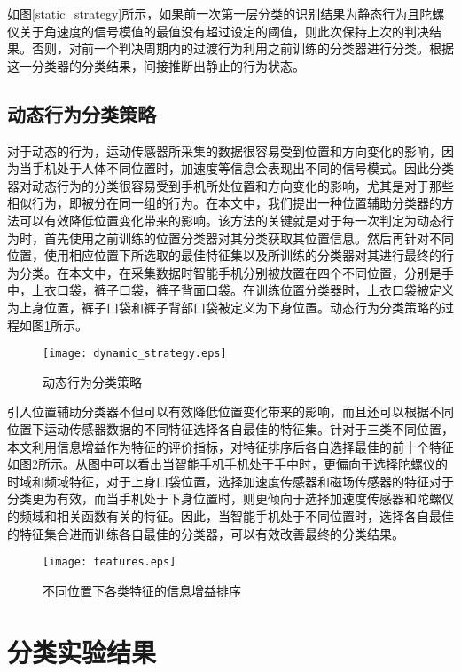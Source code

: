 \par 如图\ref{static_strategy}所示，如果前一次第一层分类的识别结果为静态行为且陀螺仪关于角速度的信号模值的最值没有超过设定的阈值，则此次保持上次的判决结果。否则，对前一个判决周期内的过渡行为利用之前训练的分类器进行分类。根据这一分类器的分类结果，间接推断出静止的行为状态。

\subsection{动态行为分类策略}
\par 对于动态的行为，运动传感器所采集的数据很容易受到位置和方向变化的影响，因为当手机处于人体不同位置时，加速度等信息会表现出不同的信号模式。因此分类器对动态行为的分类很容易受到手机所处位置和方向变化的影响，尤其是对于那些相似行为，即被分在同一组的行为。在本文中，我们提出一种位置辅助分类器的方法可以有效降低位置变化带来的影响。该方法的关键就是对于每一次判定为动态行为时，首先使用之前训练的位置分类器对其分类获取其位置信息。然后再针对不同位置，使用相应位置下所选取的最佳特征集以及所训练的分类器对其进行最终的行为分类。在本文中，在采集数据时智能手机分别被放置在四个不同位置，分别是手中，上衣口袋，裤子口袋，裤子背面口袋。在训练位置分类器时，上衣口袋被定义为上身位置，裤子口袋和裤子背部口袋被定义为下身位置。动态行为分类策略的过程如图\ref{dynamic_strategy}所示。
\begin{figure}[!htp]
 \centering
 \texttt{[image: dynamic\_strategy.eps]}
 \caption{动态行为分类策略}\label{dynamic_strategy}
\end{figure}
\par 引入位置辅助分类器不但可以有效降低位置变化带来的影响，而且还可以根据不同位置下运动传感器数据的不同特征选择各自最佳的特征集。针对于三类不同位置，本文利用信息增益作为特征的评价指标，对特征排序后各自选择最佳的前十个特征如图\ref{features}所示。从图中可以看出当智能手机手机处于手中时，更偏向于选择陀螺仪的时域和频域特征，对于上身口袋位置，选择加速度传感器和磁场传感器的特征对于分类更为有效，而当手机处于下身位置时，则更倾向于选择加速度传感器和陀螺仪的频域和相关函数有关的特征。因此，当智能手机处于不同位置时，选择各自最佳的特征集合进而训练各自最佳的分类器，可以有效改善最终的分类结果。
\begin{figure}[!htp]
 \centering
 \texttt{[image: features.eps]}
 \caption{不同位置下各类特征的信息增益排序}\label{features}
\end{figure}

\section{分类实验结果}
